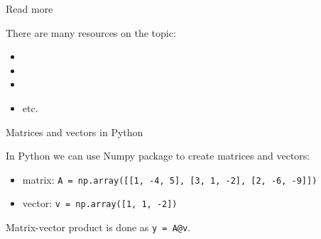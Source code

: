 \documentclass{beamer}
\begin{document}
\begin{frame}{Read more}
	\begin{flushleft}
		
		There are many resources on the topic:
		
\begin{itemize}
	\item {}
	
	\item {}
	
	\item {}
	
	\item etc.
\end{itemize}		
		
	\end{flushleft}
\end{frame}


\begin{frame}{Matrices and vectors in Python}
	\begin{flushleft}
		
		In Python we can use Numpy package to create matrices and vectors:
		
\begin{itemize}
	\item matrix: \texttt{A = np.array([[1, -4, 5], [3, 1, -2], [2, -6, -9]])}
	
	\item vector: \texttt{v = np.array([1, 1, -2])}
	
\end{itemize}		

\bigskip
	
	Matrix-vector product is done as \texttt{y = A@v}.
		
	\end{flushleft}
\end{frame}
\end{document}
